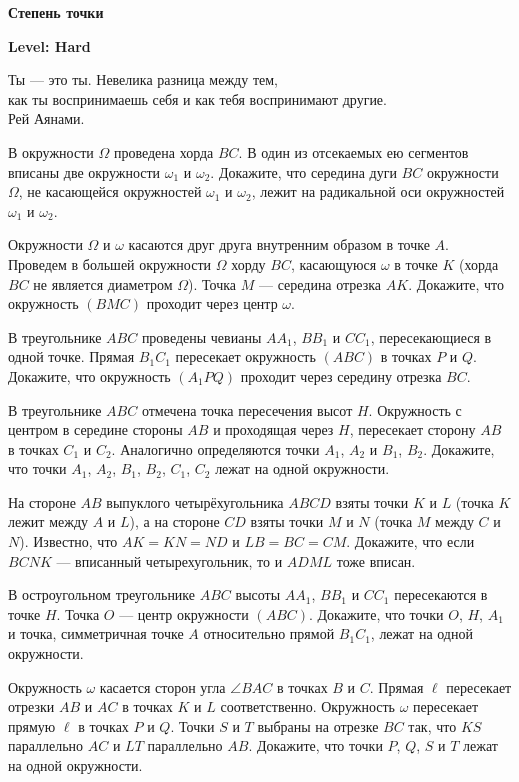 \centerline{\bf \Huge Степень точки}
\centerline{\bf \Huge Level: Hard}

\begin{flushright}
        \scriptsize{Ты --- это ты. Невелика разница между тем,\\
                    как ты воспринимаешь себя и как тебя воспринимают другие.\\
                    Рей Аянами.}
\end{flushright}

В окружности $\Omega$ проведена хорда $BC$. В один из отсекаемых ею сегментов вписаны две окружности $\omega_1$ и $\omega_2$. Докажите, что середина дуги $BC$ окружности $\Omega$, не касающейся окружностей $\omega_1$ и $\omega_2$, лежит на радикальной оси окружностей $\omega_1$ и $\omega_2$.

Окружности $\Omega$ и $\omega$ касаются друг друга внутренним образом в точке $A$. Проведем в большей окружности $\Omega$ хорду $BC$, касающуюся $\omega$ в точке $K$ (хорда $BC$ не является диаметром $\Omega$). Точка $M$ — середина отрезка $AK$. Докажите, что окружность $(BMC)$ проходит через центр $\omega$.

В треугольнике $ABC$ проведены чевианы $AA_1$, $BB_1$ и $CC_1$, пересекающиеся в одной точке. Прямая $B_1C_1$ пересекает окружность $(ABC)$ в точках $P$ и $Q$. Докажите, что окружность $(A_1PQ)$ проходит через середину отрезка $BC$.

В треугольнике $ABC$ отмечена точка пересечения высот $H$. Окружность с центром в середине стороны $AB$ и проходящая через $H$, пересекает сторону $AB$ в точках $C_1$ и $C_2$. Аналогично определяются точки $A_1$, $A_2$ и $B_1$, $B_2$. Докажите, что точки $A_1$, $A_2$, $B_1$, $B_2$, $C_1$, $C_2$ лежат на одной окружности.

На стороне $AB$ выпуклого четырёхугольника $ABCD$ взяты точки $K$ и $L$ (точка $K$ лежит между $A$ и $L$), а на стороне $CD$ взяты точки $M$ и $N$ (точка $M$ между $C$ и $N$). Известно, что $AK=KN=ND$ и $LB=BC=CM$. Докажите, что если $BCNK$ — вписанный четырехугольник, то и $ADML$ тоже вписан.

В остроугольном треугольнике $ABC$ высоты $AA_1$, $BB_1$ и $CC_1$ пересекаются в точке $H$. Точка $O$ — центр окружности $(ABC)$. Докажите, что точки $O$, $H$, $A_1$ и точка, симметричная точке $A$ относительно прямой $B_1C_1$, лежат на одной окружности.

Окружность $\omega$ касается сторон угла $\angle BAC$ в точках $B$ и $C$. Прямая $\ell$ пересекает отрезки $AB$ и $AC$ в точках $K$ и $L$ соответственно. Окружность $\omega$ пересекает прямую $\ell$ в точках $P$ и $Q$. Точки $S$ и $T$ выбраны на отрезке $BC$ так, что $KS$ параллельно $AC$ и $LT$ параллельно $AB$. Докажите, что точки $P$, $Q$, $S$ и $T$ лежат на одной окружности.



